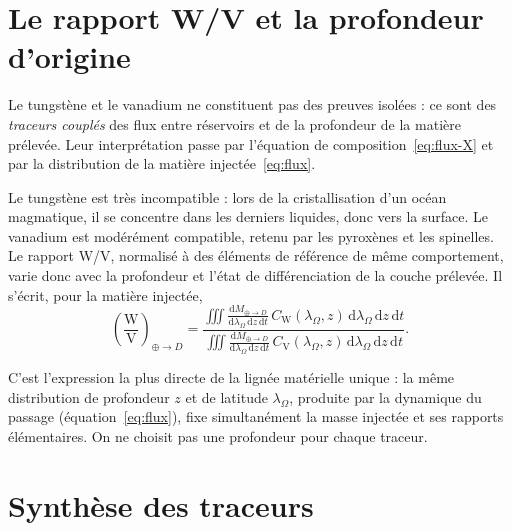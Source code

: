 \documentclass[11pt,a4paper,openany]{report}
\newcommand{\dd}{\mathrm{d}}
\begin{document}
\section{Le rapport W/V et la profondeur d'origine}

Le tungstène et le vanadium ne constituent pas des preuves isolées : ce sont des \emph{traceurs
couplés} des flux entre réservoirs et de la profondeur de la matière prélevée. Leur interprétation
passe par l'équation de composition~\eqref{eq:flux-X} et par la distribution de la matière
injectée~\eqref{eq:flux}.


Le tungstène est très incompatible : lors de la cristallisation d'un océan magmatique, il se
concentre dans les derniers liquides, donc vers la surface. Le vanadium est modérément
compatible, retenu par les pyroxènes et les spinelles. Le rapport W/V, normalisé à des éléments de
référence de même comportement, varie donc avec la profondeur et l'état de différenciation de la
couche prélevée. Il s'écrit, pour la matière injectée,
\begin{equation}
\left(\frac{\mathrm{W}}{\mathrm{V}}\right)_{\oplus\to D}=
\frac{\displaystyle\iiint\frac{\dd M_{\oplus\to D}}{\dd\lambda_\Omega\,\dd z\,\dd t}\,
C_{\mathrm{W}}(\lambda_\Omega,z)\,\dd\lambda_\Omega\,\dd z\,\dd t}
{\displaystyle\iiint\frac{\dd M_{\oplus\to D}}{\dd\lambda_\Omega\,\dd z\,\dd t}\,
C_{\mathrm{V}}(\lambda_\Omega,z)\,\dd\lambda_\Omega\,\dd z\,\dd t}.
\label{eq:WV}
\end{equation}

\begin{ideephys}
C'est l'expression la plus directe de la lignée matérielle unique : la même distribution de
profondeur $z$ et de latitude $\lambda_\Omega$, produite par la dynamique du passage
(équation~\eqref{eq:flux}), fixe simultanément la masse injectée et ses rapports élémentaires. On ne
choisit pas une profondeur pour chaque traceur.
\end{ideephys}

\section{Synthèse des traceurs}
\end{document}
